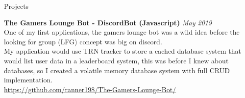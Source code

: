 \documentclass[
	11pt, %
]{crumpcv} %
\begin{document}
\begin{rSection}{Projects}

	\textbf{The Gamers Lounge Bot - DiscordBot (Javascript)} \hfill \textit{May 2019} \\ 
		One of my first applications, the gamers lounge bot was a wild idea before the looking for group (LFG) concept was big on discord. \\
		My application would use TRN tracker to store a cached database system that would list user data in a leaderboard system, this was before I knew about databases, so I created a volatile memory database system with full CRUD implementation. \\
		\href{https://github.com/Ranner198/The-Gamers-Lounge-Bot/tree/master}{https://github.com/ranner198/The-Gamers-Lounge-Bot/} \\

\end{rSection}






\end{document}
